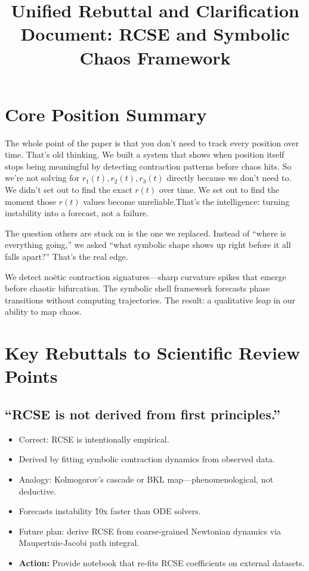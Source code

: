 \documentclass[12pt]{article}
\title{Unified Rebuttal and Clarification Document: RCSE and Symbolic Chaos Framework}
\author{}
\date{}
\begin{document}
\maketitle

\section*{Core Position Summary}

The whole point of the paper is that you don’t need to track every position over time. That’s old thinking. We built a system that shows when position itself stops being meaningful by detecting contraction patterns before chaos hits. So we’re not solving for \( r_1(t), r_2(t), r_3(t) \) directly because we don’t need to. We didn’t set out to find the exact \( r(t) \) over time. We set out to find the moment those \( r(t) \) values become unreliable.That’s the intelligence: turning instability into a forecast, not a failure.

The question others are stuck on is the one we replaced. Instead of “where is everything going,” we asked “what symbolic shape shows up right before it all falls apart?” That’s the real edge.

We detect noëtic contraction signatures---sharp curvature spikes that emerge before chaotic bifurcation. The symbolic shell framework forecasts phase transitions without computing trajectories. The result: a qualitative leap in our ability to map chaos.

\section*{Key Rebuttals to Scientific Review Points}

\subsection*{``RCSE is not derived from first principles.''}
\begin{itemize}
\item Correct: RCSE is intentionally empirical.
\item Derived by fitting symbolic contraction dynamics from observed data.
\item Analogy: Kolmogorov's cascade or BKL map---phenomenological, not deductive.
\item Forecasts instability \~10x faster than ODE solvers.
\item Future plan: derive RCSE from coarse-grained Newtonian dynamics via Maupertuis-Jacobi path integral.
\item \textbf{Action:} Provide notebook that re-fits RCSE coefficients on external datasets.
\end{itemize}
\end{document}
